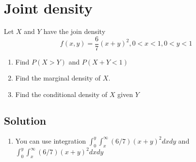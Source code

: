 \documentclass[12pt,a4paper]{article}
\begin{document}
\section{Joint density}

Let $X$ and $Y$ have the join density
\[
    f(x,y) = \frac{6}{7} (x+y)^2, 0 < x < 1, 0 < y < 1
\]

\begin{enumerate}
    \item Find $P(X>Y)$ and $P(X+Y<1)$
    \item Find the marginal density of $X$.
    \item Find the conditional density of $X$ given $Y$
\end{enumerate}

\subsection{Solution}
\begin{enumerate}
    \item You can use integration $\int_0^y\int_x^\infty (6/7) (x+y)^2 dx dy$ and $\int_0^y\int_x^\infty (6/7) (x+y)^2 dx dy$
\end{enumerate}
\end{document}
